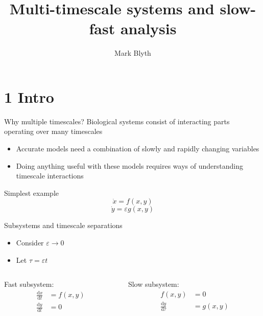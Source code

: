 \documentclass[presentation]{beamer}
\author{Mark Blyth}
\date{}
\title{Multi-timescale systems and slow-fast analysis}
\begin{document}
\maketitle

\section{1 Intro}
\label{sec:org66a5869}
\begin{frame}[label={sec:org14d0dda}]{Why multiple timescales?}
Biological systems consist of interacting parts operating over many timescales
\vfill
\begin{itemize}
\item Accurate models need a combination of slowly and rapidly changing variables
\item Doing anything useful with these models requires ways of understanding timescale interactions
\end{itemize}
\vfill
Simplest example
\[\dot{x} = f(x,y)\]
\[\dot{y} = \varepsilon g(x,y)\]
\end{frame}

\begin{frame}[label={sec:orgfaa04fa}]{Subsystems and timescale separations}
\begin{itemize}
\item Consider \(\varepsilon\to0\)
\item Let \(\tau = \varepsilon t\)
\end{itemize}
\vfill

\begin{columns}
\begin{column}{0.5\columnwidth}
Fast subsystem:
\begin{align}
\frac{\mathrm{d}x}{\mathrm{d}t} &= f(x,y) \\ \nonumber
\frac{\mathrm{d}y}{\mathrm{d}t} &= 0
\end{align}
\end{column}

\begin{column}{0.5\columnwidth}
Slow subsystem:
\begin{align}
f(x,y) &= 0 \\ \nonumber
\frac{\mathrm{d}y}{\mathrm{d}\tau} &= g(x,y)
\end{align}
\end{column}
\end{columns}
\end{frame}
\end{document}

